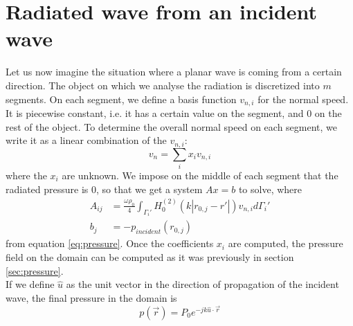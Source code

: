 \documentclass[12pt, openany]{report}
\theoremstyle{definition}
\begin{document}
\section{Radiated wave from an incident wave}
Let us now imagine the situation where a planar wave is coming from a certain direction. The object on which we analyse the radiation is discretized into $m$ segments. On each segment, we define a basis function $v_{n,i}$ for the normal speed. It is piecewise constant, i.e. it has a certain value on the segment, and 0 on the rest of the object. To determine the overall normal speed on each segment, we write it as a linear combination of the $v_{n,i}$:
\begin{equation}
    v_n = \sum_i x_i v_{n,i}
\end{equation}
where the $x_i$ are unknown. We impose on the middle of each segment that the radiated pressure is 0, so that we get a system $Ax=b$ to solve, where 
\begin{equation}
    \begin{aligned}
        A_{ij} &= \frac{\omega\rho_0}{4} \int_{\Gamma_i'}H_0^{(2)}(k|r_{0,j}-r'|)v_{n,i}d\Gamma_i'\\
        b_j &= -p_{incident}(r_{0,j})
    \end{aligned}
\end{equation}
from equation \eqref{eq:pressure}. Once the coefficients $x_i$ are computed, the pressure field on the domain can be computed as it was previously in section \ref{sec:pressure}. \\

If we define $\hat u$ as the unit vector in the direction of propagation of the incident wave, the final pressure in the domain is 
\begin{equation}
    p(\vec{r}) = P_0 e^{-jk\hat u \cdot \vec{r}}
\end{equation}
\end{document}
